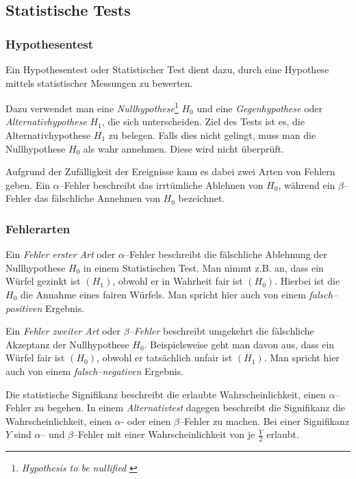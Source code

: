 \documentclass[12pt,a4paper]{scrartcl}
\numberwithin{equation}{section} %
\begin{document}
\hypertarget{statistische-tests}{%
\subsection{Statistische Tests}\label{statistische-tests}}

\hypertarget{hypothesentest}{%
\subsubsection{Hypothesentest}\label{hypothesentest}}

Ein Hypothesentest oder Statistischer Test dient dazu, durch eine Hypothese mittels statistischer Messungen zu bewerten.

Dazu verwendet man eine \emph{Nullhypothese}\footnote{\emph{Hypothesis  to be nullified} \cite{Gigerenzer}} \(H_0\) und eine \emph{Gegenhypothese} oder \emph{Alternativhypothese} \(H_1\), die sich unterscheiden. Ziel des Tests ist es, die Alternativhypothese \(H_1\) zu belegen. Falls dies nicht gelingt, muss man die Nullhypothese \(H_0\) als wahr annehmen. Diese wird nicht überprüft. \cite{Statistical Inference}

Aufgrund der Zufälligkeit der Ereignisse kann es dabei zwei Arten von Fehlern geben. Ein \(\alpha\)--Fehler beschreibt das irrtümliche Ablehnen von \(H_0\), während ein \(\beta\)--Fehler das fälschliche Annehmen von \(H_0\) bezeichnet.

\hypertarget{fehlerarten}{%
\subsubsection{Fehlerarten}\label{fehlerarten}}
Ein \emph{Fehler erster Art} oder \(\alpha\)--Fehler beschreibt die fälschliche Ablehnung der Nullhypothese \(H_0\) in einem Statistischen Test. Man nimmt z.B. an, dass ein Würfel gezinkt ist \((H_1)\), obwohl er in Wahrheit fair ist \((H_0)\). Hierbei ist die \(H_0\) die Annahme eines fairen Würfels. Man spricht hier auch von einem \emph{falsch--positiven} Ergebnis. \cite{Statistical Inference}

Ein \emph{Fehler zweiter Art} oder \emph{\(\beta\)--Fehler} beschreibt umgekehrt die fälschliche Akzeptanz der Nullhypothese \(H_0\). Beispielsweise geht man davon aus, dass ein Würfel fair ist \((H_0)\), obwohl er tatsächlich unfair ist \((H_1)\). Man spricht hier auch von einem \emph{falsch--negativen} Ergebnis. \cite{Statistical Inference}

Die statistische Signifikanz beschreibt die erlaubte Wahrscheinlichkeit, einen \(\alpha\)--Fehler zu begehen. \cite{Statistical Inference} In einem \emph{Alternativtest} dagegen beschreibt die Signifikanz die Wahrscheinlichkeit, einen \(\alpha\)- oder einen \(\beta\)--Fehler zu machen. Bei einer Signifikanz \(Y\) sind \(\alpha\)-- und \(\beta\)--Fehler mit einer Wahrscheinlichkeit von je \(\frac{Y}{2}\) erlaubt.
\end{document}
